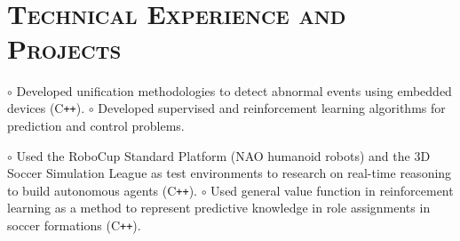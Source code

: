 \begin{resume}

\begin{formatb}
  \\
  \body\\
\end{formatb}





\begin{formatb}
  \\
  \body\\
\end{formatb}

\vspace{-2mm}
\section{\textsc{Technical Experience and Projects}}

\begin{position}
$\circ$ Developed  unification methodologies to detect abnormal events using embedded devices 
(C\texttt{++}). \newline
$\circ$ Developed supervised  and reinforcement learning algorithms for prediction and control 
problems.
\end{position}

\begin{position}
$\circ$ Used the RoboCup Standard Platform (NAO humanoid robots) and the 3D Soccer Simulation 
League as 
test environments to research on real-time reasoning to build autonomous agents (C\texttt{++}). 
\newline $\circ$  
Used 
general value function in reinforcement learning as a method to  represent predictive knowledge in 
role assignments in soccer formations (C\texttt{++}).
\end{position}


\end{resume}
